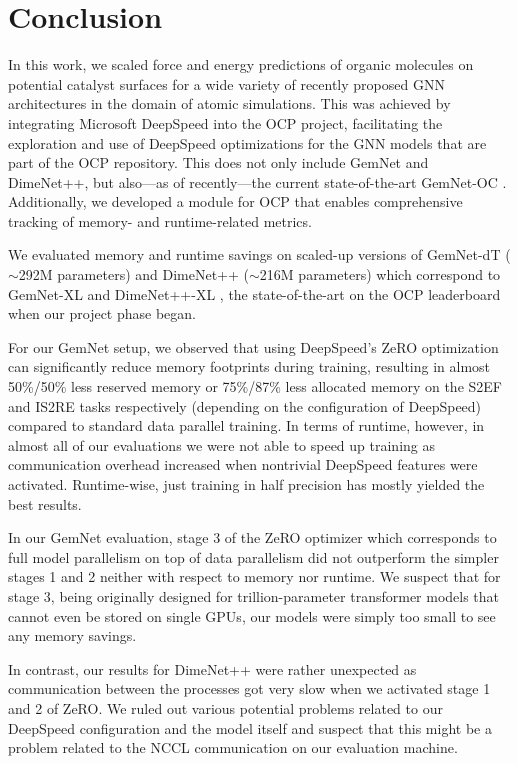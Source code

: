 \section{Conclusion}
\label{section:conclusion}

In this work, we scaled force and energy predictions of organic molecules on
potential catalyst surfaces for a wide variety of recently proposed GNN architectures
in the domain of atomic simulations. This was achieved by integrating Microsoft DeepSpeed 
into the OCP project, facilitating the exploration and use of DeepSpeed optimizations
for the GNN models that are part of the OCP repository. This does not
only include GemNet and DimeNet++, but also---as of recently---the current state-of-the-art
GemNet-OC \cite{https://doi.org/10.48550/arxiv.2204.02782}.
Additionally, we developed a module for OCP that enables comprehensive tracking
of memory- and runtime-related metrics. 

We evaluated memory and runtime savings on scaled-up versions of GemNet-dT
($\sim$292M parameters) and DimeNet++ ($\sim$216M parameters) which correspond to
GemNet-XL and DimeNet++-XL \cite{https://doi.org/10.48550/arxiv.2203.09697}, 
the state-of-the-art on the OCP leaderboard when our project phase began. 

For our GemNet setup, we observed that using DeepSpeed's ZeRO optimization 
can significantly reduce memory footprints during training, resulting in 
almost 50\%/50\% less reserved memory or 75\%/87\% less allocated memory on the S2EF
and IS2RE tasks respectively (depending on the configuration of DeepSpeed) compared to standard data parallel training. 
In terms of runtime, however, in almost all of our evaluations we were not able to speed up 
training as communication overhead increased when 
nontrivial DeepSpeed features were activated. Runtime-wise, just training in half
precision has mostly yielded the best results.

In our GemNet evaluation, stage 3 of the ZeRO optimizer which corresponds to full model parallelism on top
of data parallelism did not outperform the simpler stages 1 and 2 neither with respect to
memory nor runtime. We suspect that for stage 3, being originally designed for trillion-parameter
transformer models that cannot even be stored on single GPUs, our models
were simply too small to see any memory savings.

In contrast, our results for DimeNet++ were rather unexpected as communication
between the processes got very slow when we activated stage 1 and 2 of ZeRO.
We ruled out various potential problems related to our DeepSpeed configuration and
the model itself and suspect that this might be a problem related to the NCCL communication on our evaluation 
machine.

